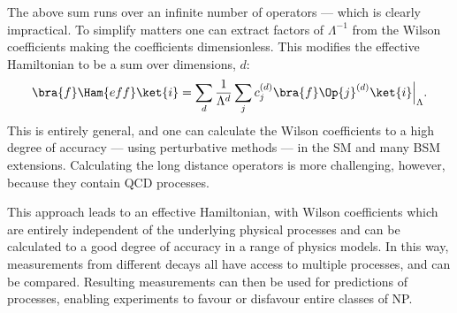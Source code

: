 The above sum runs over an infinite number of operators --- which is clearly impractical.
To simplify matters one can extract factors of $\Lambda^{-1}$ from the Wilson coefficients
making the coefficients dimensionless.
This modifies the effective Hamiltonian to be a sum over dimensions, $d$:
\begin{equation}
  \bra{f}\Ham{eff}\ket{i} =
  \sum_{d}\frac{1}{\Lambda^{d}}
  \sum_j c_j^{(d)}\bra{f}\Op{j}^{(d)}\ket{i}\Big|_{\Lambda}.
\end{equation}
This is entirely general, and one can calculate the Wilson coefficients to a high degree of
accuracy --- using perturbative methods --- in the SM and many BSM extensions.
Calculating the long distance operators is more challenging, however, because they contain QCD
processes.

This approach leads to an effective Hamiltonian, with Wilson coefficients which are entirely
independent of the underlying physical processes and can be calculated to a good degree of accuracy
in a range of physics models.
In this way, measurements from different decays all have access to multiple processes, and can be
compared.
Resulting measurements can then be used for predictions of processes, enabling experiments to
favour or disfavour entire classes of NP.



